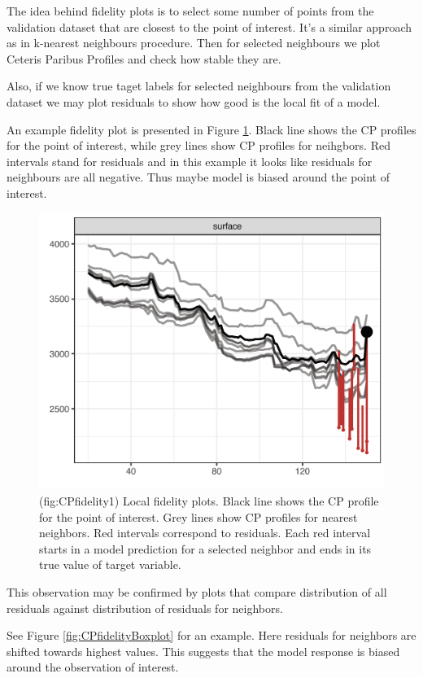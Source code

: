 \documentclass[]{krantz}
\theoremstyle{definition}
\theoremstyle{definition}
\theoremstyle{definition}
\theoremstyle{remark}
\begin{document}
The idea behind fidelity plots is to select some number of points from
the validation dataset that are closest to the point of interest. It's a
similar approach as in k-nearest neighbours procedure. Then for selected
neighbours we plot Ceteris Paribus Profiles and check how stable they
are.

Also, if we know true taget labels for selected neighbours from the
validation dataset we may plot residuals to show how good is the local
fit of a model.

An example fidelity plot is presented in Figure \ref{fig:CPfidelity1}.
Black line shows the CP profiles for the point of interest, while grey
lines show CP profiles for neihgbors. Red intervals stand for residuals
and in this example it looks like residuals for neighbours are all
negative. Thus maybe model is biased around the point of interest.

\begin{figure}

{\centering \includegraphics[width=0.7\linewidth]{figure/cp_fidelity_1} 

}

\caption{(fig:CPfidelity1) Local fidelity plots. Black line shows the CP profile for the point of interest. Grey lines show CP profiles for nearest neighbors. Red intervals correspond to residuals. Each red interval starts in a model prediction for a selected neighbor and ends in its true value of target variable.}\label{fig:CPfidelity1}
\end{figure}

This observation may be confirmed by plots that compare distribution of
all residuals against distribution of residuals for neighbors.

See Figure \ref{fig:CPfidelityBoxplot} for an example. Here residuals
for neighbors are shifted towards highest values. This suggests that the
model response is biased around the observation of interest.
\end{document}
